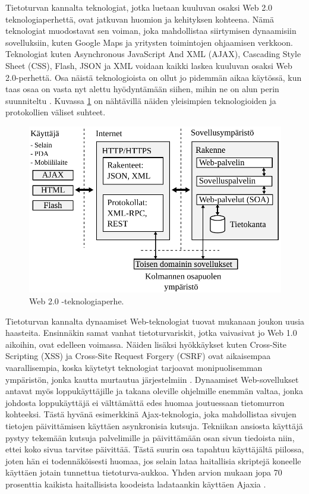 Tietoturvan kannalta teknologiat, jotka luetaan kuuluvan osaksi Web 2.0
teknologiaperhettä, ovat jatkuvan huomion ja kehityksen kohteena. Nämä teknologiat
muodostavat sen voiman, joka mahdollistaa siirtymisen dynaamisiin
sovelluksiin, kuten Google Maps ja yritysten toimintojen ohjaamisen verkkoon.
Teknologiat kuten Asynchronous JavaScript And XML (AJAX), Cascading Style Sheet (CSS),
Flash, JSON ja XML voidaan kaikki laskea kuuluvan osaksi Web 2.0-perhettä.
Osa näistä teknologioista on ollut jo pidemmän aikaa käytössä, kun taas osaa on
vasta nyt alettu hyödyntämään siihen, mihin ne on alun perin suunniteltu \cite{WEB2}.
Kuvassa \ref{web} on nähtävillä näiden yleisimpien teknologioiden ja protokollien
väliset suhteet.

\begin{figure}[htp]
\centering
\includegraphics[width=12cm]{pics/web_ymparisto.pdf}
\caption{Web 2.0 -teknologiaperhe.}
\label{web}
\end{figure}

Tietoturvan kannalta dynaamiset Web-teknologiat tuovat mukanaan joukon uu\-si\-a haasteita. Ensinnäkin
samat vanhat tietoturvariskit, jotka vaivasivat jo Web 1.0 aikoihin, ovat edelleen voimassa. Näiden lisäksi
hyökkäykset kuten Cross-Site Scripting (XSS) ja Cross-Site Request Forgery (CSRF) 
ovat aikaisempaa vaarallisempia, koska käytetyt teknologiat tarjoavat
monipuolisemman ympäristön, jonka kautta murtautua järjestelmiin \cite{WEB2}. Dynaamiset
Web-sovellukset antavat myös loppukäyttäjille ja takana oleville ohjelmille enemmän
valtaa, jonka johdosta loppukäyttäjä ei välttämättä edes huomaa joutuessaan
tietomurron kohteeksi. Tästä hyvänä esimerkkinä Ajax-teknologia, joka mahdollistaa
sivujen tietojen päivittämisen käyttäen asynkronisia kutsuja. Tekniikan ansiosta
käyttäjä pystyy tekemään kutsuja palvelimille ja päivittämään osan sivun
tiedoista niin, ettei koko sivua tarvitse päivittää. Tästä suurin osa tapahtuu
käyttäjältä piilossa, joten hän ei todennäköisesti huomaa, jos selain lataa
haitallisia skriptejä koneelle käyttäen jotain tunnettua tietoturva-aukkoa. Yhden
arvion mukaan jopa 70 prosenttia kaikista haitallisista koodeista ladataankin käyttäen
Ajaxia \cite{WEB2c}.

